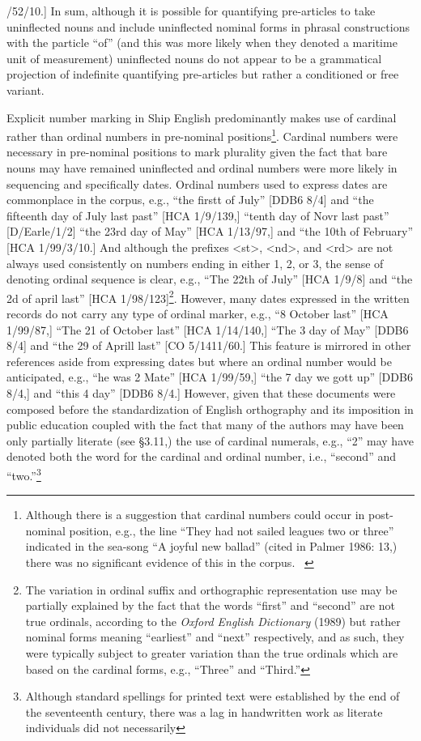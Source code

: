 \documentclass[12pt]{article}
\newenvironment{styleStandard}{\renewcommand\baselinestretch{1.0}\setlength\leftskip{0cm}\setlength\rightskip{0cm plus 1fil}\setlength\parindent{0cm}\setlength\parfillskip{0pt plus 1fil}\setlength\parskip{0in plus 1pt}\writerlistparindent\writerlistleftskip\leavevmode\normalfont\normalsize\writerlistlabel\ignorespaces}{\unskip\vspace{0in plus 1pt}\par}
\newcommand\writerlistleftskip{}
\newcommand\writerlistparindent{}
\newcommand\writerlistlabel{}
\begin{document}
\begin{styleStandard}
1/52/10.] In sum, although it is possible for quantifying pre-articles to take uninflected nouns and include uninflected nominal forms in phrasal constructions with the particle “of” (and this was more likely when they denoted a maritime unit of measurement) uninflected nouns do not appear to be a grammatical projection of indefinite quantifying pre-articles but rather a conditioned or free variant. 
\end{styleStandard}


\begin{styleStandard}
Explicit number marking in Ship English predominantly makes use of cardinal rather than ordinal numbers in pre-nominal positions\footnote{ Although there is a suggestion that cardinal numbers could occur in post-nominal position, e.g., the line “They had not sailed leagues two or three” indicated in the sea-song “A joyful new ballad” (cited in Palmer 1986: 13,) there was no significant evidence of this in the corpus. \ }. Cardinal numbers were necessary in pre-nominal positions to mark plurality given the fact that bare nouns may have remained uninflected and ordinal numbers were more likely in sequencing and specifically dates. Ordinal numbers used to express dates are commonplace in the corpus, e.g., “the firstt of July” [DDB6 8/4] and “the fifteenth day of July last past” [HCA 1/9/139,] “tenth day of Novr last past” [D/Earle/1/2] “the 23rd day of May” [HCA 1/13/97,] and “the 10th of February” [HCA 1/99/3/10.] And although the prefixes {\textless}st{\textgreater}, {\textless}nd{\textgreater}, and {\textless}rd{\textgreater} are not always used consistently on numbers ending in either 1, 2, or 3, the sense of denoting ordinal sequence is clear, e.g., “The 22th of July” [HCA 1/9/8] and “the 2d of april last” [HCA 1/98/123]\footnote{ The variation in ordinal suffix and orthographic representation use may be partially explained by the fact that the words “first” and “second” are not true ordinals, according to the \textit{Oxford English Dictionary} (1989) but rather nominal forms meaning “earliest” and “next” respectively, and as such, they were typically subject to greater variation than the true ordinals which are based on the cardinal forms, e.g., “Three” and “Third.”}. However, many dates expressed in the written records do not carry any type of ordinal marker, e.g., “8 October last” [HCA 1/99/87,] “The 21 of October last” [HCA 1/14/140,] “The 3 day of May” [DDB6 8/4] and “the 29 of Aprill last” [CO 5/1411/60.] This feature is mirrored in other references aside from expressing dates but where an ordinal number would be anticipated, e.g., “he was 2 Mate” [HCA 1/99/59,] “the 7 day we gott up” [DDB6 8/4,] and “this 4 day” [DDB6 8/4.] However, given that these documents were composed before the standardization of English orthography and its imposition in public education coupled with the fact that many of the authors may have been only partially literate (see §3.11,) the use of cardinal numerals, e.g., “2” may have denoted both the word for the cardinal and ordinal number, i.e., “second” and “two.”\footnote{ Although standard spellings for printed text were established by the end of the seventeenth century, there was a lag in handwritten work as literate individuals did not necessarily 
\end{styleStandard}
\end{document}

